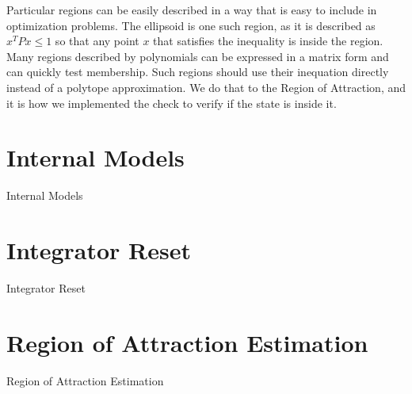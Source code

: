 Particular regions can be easily described in a way that is easy to include in
optimization problems. The ellipsoid is one such region, as it is described as
\(x^{T}Px\leq{}1\) so that any point \(x\) that satisfies the inequality is inside
the region. Many regions described by polynomials can be expressed in a matrix
form and can quickly test membership. Such regions should use their inequation
directly instead of a polytope approximation.  We do that to the Region of
Attraction, and it is how we implemented the check to verify if the state is
inside it.

\section{Internal Models}%
\label{sec:internal-models}

Internal Models

\section{Integrator Reset}%
\label{sec:integrator-reset}

Integrator Reset

\section{Region of Attraction Estimation}%
\label{sec:roa-estimation}

Region of Attraction Estimation

